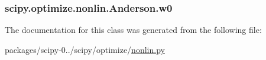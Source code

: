 \subsubsection[{w0}]{\setlength{\rightskip}{0pt plus 5cm}scipy.\+optimize.\+nonlin.\+Anderson.\+w0}\label{classscipy_1_1optimize_1_1nonlin_1_1Anderson_ad4494abfd0d519f4551d625021a9f1ba}


The documentation for this class was generated from the following file\+:\begin{DoxyCompactItemize}
\item 
packages/scipy-\/0../scipy/optimize/\hyperlink{nonlin_8py}{nonlin.\+py}\end{DoxyCompactItemize}
